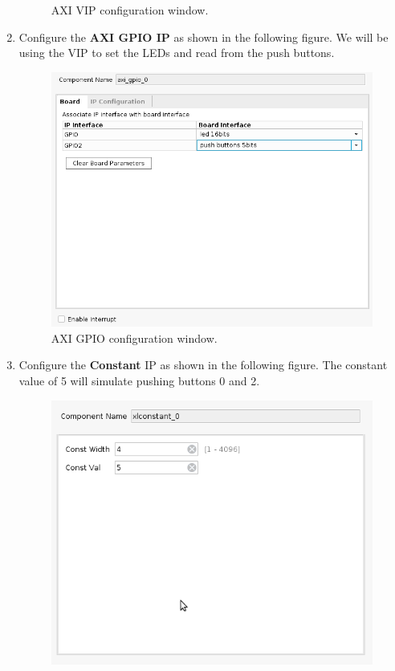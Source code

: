 \documentclass[12pt]{article}
\begin{document}
\begin{enumerate}
\begin{figure}[H]
		  \caption{AXI VIP configuration window.}
		  \label{fig:axivipconfig}
		\end{figure}
	\item Configure the \textbf{AXI GPIO IP} as shown in the following figure. We will be using the VIP to set the LEDs and read from the push buttons.
		\begin{figure}[H]
		  \centering
		  \includegraphics[scale=0.5]{axigpioconfig.png}
		  \caption{AXI GPIO configuration window.}
		  \label{fig:axigpioconfig}
		\end{figure}
	\item Configure the \textbf{Constant} IP as shown in the following figure. The constant value of 5 will simulate pushing buttons 0 and 2.
		\begin{figure}[H]
		  \centering
		  \includegraphics[scale=0.5]{axiconstantconfig.png}

\end{figure}
\end{enumerate}
\end{document}
